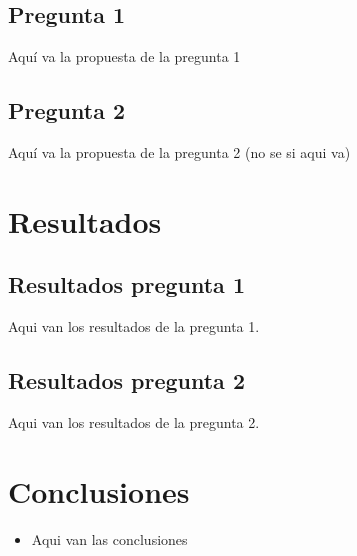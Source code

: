\documentclass[12pt,letterpaper]{article}
\begin{document}
\subsection{Pregunta 1}
Aquí va la propuesta de la pregunta 1

\subsection{Pregunta 2}
Aquí va la propuesta de la pregunta 2 (no se si aqui va)


\section{Resultados}
\subsection{Resultados pregunta 1}
Aqui van los resultados de la pregunta 1.

\subsection{Resultados pregunta 2}
Aqui van los resultados de la pregunta 2.





\section{Conclusiones}
\begin{itemize}
    \item Aqui van las conclusiones
\end{itemize}

\printbibliography

		
\end{document}
